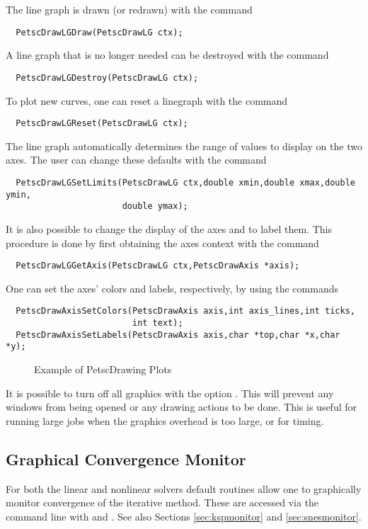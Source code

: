 The line graph is drawn (or redrawn) with the command 
\begin{verbatim}
  PetscDrawLGDraw(PetscDrawLG ctx);
\end{verbatim}
A line graph that is no longer needed can be destroyed with the 
command 
\begin{verbatim}
  PetscDrawLGDestroy(PetscDrawLG ctx);
\end{verbatim}
To plot new curves, one can reset a linegraph with the
command 
\begin{verbatim}
  PetscDrawLGReset(PetscDrawLG ctx);
\end{verbatim}
The line graph automatically determines the range of values to 
display on the two axes.  The user can change these defaults with the 
command 
\begin{verbatim}
  PetscDrawLGSetLimits(PetscDrawLG ctx,double xmin,double xmax,double ymin,
                       double ymax);
\end{verbatim}

It is also possible to change the display of the axes and to label
them. This procedure is done by first obtaining the axes context with the 
command  
\begin{verbatim}
  PetscDrawLGGetAxis(PetscDrawLG ctx,PetscDrawAxis *axis);
\end{verbatim}
One can set the axes' colors and labels, respectively, by using the
commands  
\begin{verbatim}
  PetscDrawAxisSetColors(PetscDrawAxis axis,int axis_lines,int ticks,
                         int text);
  PetscDrawAxisSetLabels(PetscDrawAxis axis,char *top,char *x,char *y);
\end{verbatim}

\begin{figure}[H]
{\small
{}
}
\caption{Example of PetscDrawing Plots}
\label{fig:plot}
\end{figure}

It is possible to turn off all graphics with the option 
. This
will prevent any windows from being opened or any drawing actions to be done.
This is useful for running large jobs when the graphics overhead is too
large, or for timing.

\subsection{Graphical Convergence Monitor}
For both the linear and nonlinear solvers default routines
allow one to graphically monitor convergence of the iterative method.
These are accessed via the command line with 
 and . 
 See also Sections \ref{sec:kspmonitor} and
\ref{sec:snesmonitor}. 

